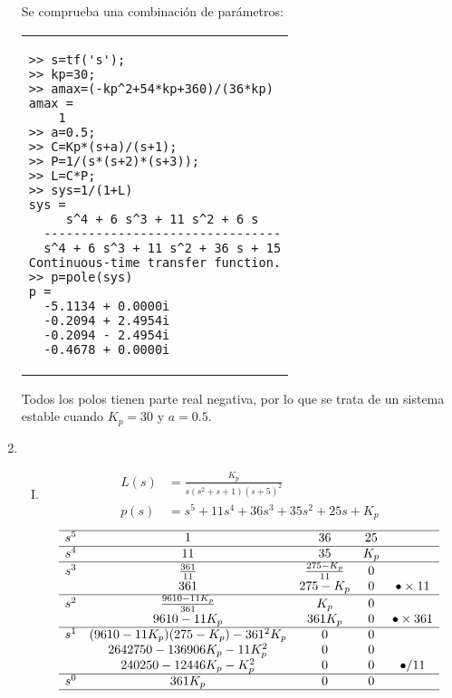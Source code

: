 \begin{ejercicio}
\begin{enumerate}
  Se comprueba una combinación de parámetros:

  \begin{center}
  \begin{tabular}{p{}}
  \toprule
    \begin{verbatim}
>> s=tf('s');
>> kp=30;
>> amax=(-kp^2+54*kp+360)/(36*kp)
amax =
    1
>> a=0.5;
>> C=Kp*(s+a)/(s+1);
>> P=1/(s*(s+2)*(s+3));
>> L=C*P;
>> sys=1/(1+L)
sys =
     s^4 + 6 s^3 + 11 s^2 + 6 s
  --------------------------------
  s^4 + 6 s^3 + 11 s^2 + 36 s + 15
Continuous-time transfer function.
>> p=pole(sys)
p =
  -5.1134 + 0.0000i
  -0.2094 + 2.4954i
  -0.2094 - 2.4954i
  -0.4678 + 0.0000i
    \end{verbatim}
  \bottomrule
  \end{tabular}
  \end{center}

  Todos los polos tienen parte real negativa, por lo que se trata de un sistema estable cuando $K_p=30$ y $a=0.5$.
  

    \item 
    \begin{enumerate}[I.]
      \item 
        \begin{align*}
          L(s) &= \frac{K_p}{s(s^2+s+1)(s+5)^2}
          \\
          p(s) &= s^5 + 11 s^4 + 36 s^3 + 35 s^2 + 25 s + K_p
        \end{align*}
        \[
          \begin{matrix}
          \hline
          s^5 & 1 & 36 & 25
          \\\hline
          s^4 & 11 & 35 & K_p
          \\\hline
          s^3 & \frac{361}{11} & \frac{275-K_p}{11} & 0
          \\
          & 361 & 275-K_p & 0 & \bullet \times 11
          \\\hline
          s^2 & \frac{9610-11K_p}{361} & K_p & 0
          \\
          & 9610-11K_p & 361 K_p & 0  & \bullet \times 361
          \\\hline
          s^1 & (9610-11K_p)(275-K_p) - 361^2K_p & 0 & 0
          \\
          & 2642750 - 136906 K_p - 11 K_p^2 & 0 & 0          
          \\
          & 240250 - 12446 K_p - K_p^2 & 0 & 0 & \bullet / 11
          \\\hline
          s^0 & 361K_p & 0 & 0
          \\\hline
          \end{matrix}
        \]


\end{enumerate}
\end{enumerate}
\end{ejercicio}
